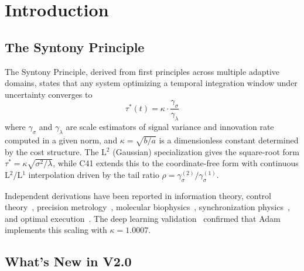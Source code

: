 \documentclass[11pt,a4paper]{article}
\begin{document}
\begin{abstract}
\medskip\noindent
Related work: The Syntony Principle V4.1 (DOI: \href{https://doi.org/10.5281/zenodo.17254395}{10.5281/zenodo.17254395}); Conjecture 41 (DOI: \href{https://doi.org/10.5281/zenodo.18911127}{10.5281/zenodo.18911127}); Deep Learning Validation (DOI: \href{https://doi.org/10.5281/zenodo.18527033}{10.5281/zenodo.18527033}).
\end{abstract}

\newpage
\tableofcontents
\vspace{1em}

\section{Introduction}

\subsection{The Syntony Principle}

The Syntony Principle, derived from first principles across multiple adaptive domains, states that any system optimizing a temporal integration window under uncertainty converges to
\begin{equation}\label{eq:syntony}
  \tau^*(t) = \kappa \cdot \frac{\gamma_\sigma}{\gamma_\lambda}
\end{equation}
where $\gamma_\sigma$ and $\gamma_\lambda$ are scale estimators of signal variance and innovation rate computed in a given norm, and $\kappa = \sqrt{b/a}$ is a dimensionless constant determined by the cost structure. The L$^2$ (Gaussian) specialization gives the square-root form $\tau^* = \kappa\sqrt{\sigma^2/\lambda}$, while C41 extends this to the coordinate-free form with continuous L$^2$/L$^1$ interpolation driven by the tail ratio $\rho = \gamma^{(2)}_\sigma / \gamma^{(1)}_\sigma$.

Independent derivations have been reported in information theory, control theory~\cite{kalman1960,wiener1949}, precision metrology~\cite{allan1966}, molecular biophysics~\cite{berg1977}, synchronization physics~\cite{kuramoto1975}, and optimal execution~\cite{almgren2001}. The deep learning validation~\cite{bronsard2026dl} confirmed that Adam implements this scaling with $\kappa = 1.0007$.

\subsection{What's New in V2.0}
\end{document}
